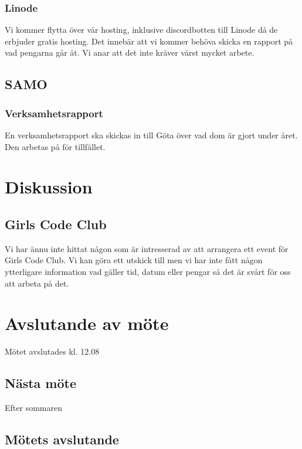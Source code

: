 \documentclass[protokoll]{dvd}
\begin{document}
    \subsubsection*{Linode}
    Vi kommer flytta över vår hosting, inklusive discordbotten till Linode då de erbjuder gratis hosting.
    Det innebär att vi kommer behöva skicka en rapport på vad pengarna går åt. Vi anar att det inte kräver värst mycket arbete.


\subsection{SAMO}

    \subsubsection*{Verksamhetsrapport}
    En verksamhetsrapport ska skickas in till Göta över vad dom är gjort under året. Den arbetas på för tillfället.


\section{Diskussion}

    \subsection*{Girls Code Club}
    Vi har ännu inte hittat någon som är intresserad av att arrangera ett event för Girls Code Club.
    Vi kan göra ett utskick till men vi har inte fått någon ytterligare information vad gäller tid, datum eller pengar så det är svårt för oss att arbeta på det.


\section{Avslutande av möte}
Mötet avslutades kl. 12.08


\subsection{Nästa möte}
Efter sommaren

\subsection{Mötets avslutande}

\styrelsesignaturer
\end{document}
